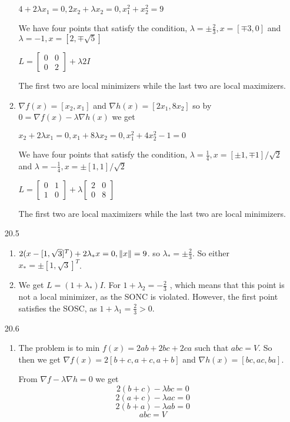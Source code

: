 \documentclass[10pt,a4paper]{article}
\DeclarePairedDelimiter{\l2}{\lVert}{\rVert}
\newcommand\m[1]{\begin{bmatrix}#1\end{bmatrix}}
\begin{document}
\begin{enumerate}
\begin{enumerate}
        $4 + 2 \lambda x_1= 0, 2x_2 + \lambda x_2 = 0, x_1^2 + x_2^2 = 9 $

        We have four points that satisfy the condition, $\lambda = \pm \frac{2}{3}, x = [\mp3, 0]$ and $\lambda = -1, x = [2, \mp \sqrt5]$ 

        $L = \m{0 & 0 \\ 0 & 2} + \lambda 2I $
        
        The first two are local minimizers while the last two are local maximizers. 

        \item $\nabla f(x) = [ x_2, x_1]$ and $\nabla h(x) = [2x_1, 8x_2]$ so by $0 = \nabla f(x) - \lambda \nabla h(x)$ we get
    
        $x_2 + 2 \lambda x_1= 0, x_1 + 8\lambda x_2 = 0, x_1^2 + 4x_2^2 -1 = 0 $

        We have four points that satisfy the condition, $\lambda = \frac{1}{4}, x = [\pm 1,\mp1] / \sqrt2$ and $\lambda = -\frac{1}{4}, x = \pm [1, 1] / \sqrt2$ 

        $L = \m{0 & 1 \\ 1 & 0} + \lambda \m{2 & 0 \\ 0 & 8} $

        The first two are local maximizers while the last two are local minimizers. 

    \end{enumerate}

    \item [20.5] \begin{enumerate}
        \item $2(x - [1, \sqrt3]^T) + 2 \lambda_*x = 0, \l2{x}= 9$. so $\lambda_* = \pm \frac{2}{3}$. So either $x_* = \pm [1, \sqrt3]^T$.
        \item We get $L = (1 + \lambda_*)I$. For $1+ \lambda_2 = -\frac{2}{3}$ , which means that this point is not a local minimizer, as the SONC is violated.
        However, the first point satisfies the SOSC, as $1 + \lambda_1 = \frac{2}{3} > 0$. 
    \end{enumerate}

    \item [20.6] \begin{enumerate}
        \item The problem is to min $f(x) = 2ab + 2bc + 2ca$ such that $abc = V$. So then we get $\nabla f(x) = 2[b+c, a+c, a+b]$ and $\nabla h(x) = [bc, ac, ba]$.
        
        From $\nabla f - \lambda \nabla h = 0$ we get 
        $$2(b+c) - \lambda bc = 0$$
        $$2(a+c) - \lambda ac = 0$$
        $$2(b+a) - \lambda ab = 0$$
        $$abc = V $$


\end{enumerate}
\end{enumerate}
\end{document}
